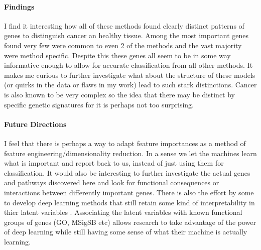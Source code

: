 \paragraph{Findings}
I find it interesting how all of these methods found clearly distinct patterns of genes to distinguish cancer an healthy tissue.
Among the most important genes found very few were common to even 2 of the methods and the vast majority were method specific.
Despite this these genes all seem to be in some way informative enough to allow for accurate classification from all other methods.
It makes me curious to further investigate what about the structure of these models (or quirks in the data or flaws in my work) lead to such stark distinctions.
Cancer is also known to be very complex so the idea that there may be distinct by specific genetic signatures for it is perhaps not too surprising.

\paragraph{Future Directions}
I feel that there is perhaps a way to adapt feature importances as a method of feature engineering/dimensionality reduction.
In a sense we let the machines learn what is important and report back to us, instead of just using them for classification.
It would also be interesting to further investigate the actual genes and pathways discovered here and look for functional consequences or interactions between differently important genes.
There is also the effort by some to develop deep learning methods that still retain some kind of interpretability in thier latent variables \cite{dv}. Associating the latent variables with known functional groups of genes (GO, MSigSB etc) allows research to take advantage of the power of deep learning while still having some sense of what their machine is actually learning.
